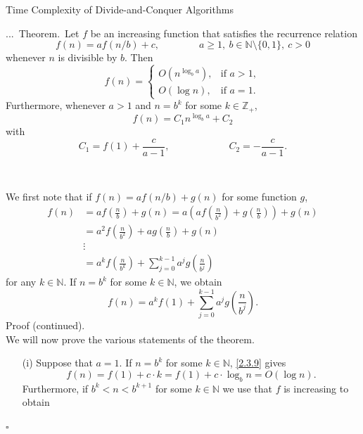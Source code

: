 \documentclass[smaller,hyperref={CJKbookmarks=true}]{beamer}
\newcommand{\N}{\mathbb{N}} \newcommand{\Z}{\mathbb{Z}} \newcommand{\Q}{\mathbb{Q}}
\newenvironment{PROOF}{{\noindent\!\sf\alert{Proof.}}\\}{\hfill$\square$\\}
\newcounter{zhuo}[subsection]
\renewcommand{\thezhuo}{\thesection.\thesubsection.\arabic{zhuo}}
\newenvironment{THEOREM}{\stepcounter{zhuo}\alert{\thezhuo.~Theorem.\,}}{}
\begin{document}
\begin{frame}{Time Complexity of Divide-and-Conquer Algorithms}
\begin{spacing}{1}
\begin{THEOREM}
Let $f$ be an increasing function that satisfies the recurrence relation
\[f(n)=af(n/b)+c,\qquad\qquad
a\geq1,~b\in\N\setminus\{0,1\},~c>0\]
whenever $n$ is divisible by $b$. Then
\[f(n)=\begin{cases}
         O(n^{\log_ba}), & \mbox{if } a>1,\\
         O(\log n), & \mbox{if } a=1.
       \end{cases}\]
Furthermore, whenever $a>1$ and $n=b^k$ for some $k\in\Z_+$,
\begin{equation}\label{2.3.8}
  f(n)=C_1n^{\log_ba}+C_2
\end{equation}
with
\[C_1=f(1)+\frac{c}{a-1},\qquad\qquad\qquad
C_2=-\frac{c}{a-1}.\]
\end{THEOREM}
\end{spacing}
\begin{PROOF}
\begin{spacing}{0.9}
We first note that if $f(n)=af(n/b)+g(n)$ for some function $g$,
\begin{equation*}
  \begin{split}
     f(n) &=af\left(\frac{n}{b}\right)+g(n)=a\left(af\left(\frac{n}{b^2}\right)+g\left(\frac{n}{b}\right)\right)+g(n) \\
       &=a^2f\left(\frac{n}{b^2}\right)+ag\left(\frac{n}{b}\right)+g(n) \\
       &\vdots \\
       &=a^kf\left(\frac{n}{b^k}\right)+\sum_{j=0}^{k-1}a^jg\left(\frac{n}{b^j}\right)
  \end{split}
\end{equation*}
for any $k\in\N$. If $n=b^k$ for some $k\in\N$, we obtain
\begin{equation}\label{2.3.9}
f(n)=a^kf(1)+\sum_{j=0}^{k-1}a^jg\left(\frac{n}{b^j}\right).
\end{equation}
\newpage
\alert{Proof (continued).}\\
We will now prove the various statements of the theorem.
\begin{itemize}
  \item[(i)] Suppose that $a=1$. If $n=b^k$ for some $k\in\N$, \eqref{2.3.9} gives
      \[f(n)=f(1)+c\cdot k=f(1)+c\cdot\log_bn=O(\log n).\]
      Furthermore, if $b^k<n<b^{k+1}$ for some $k\in\N$ we use that $f$ is increasing to obtain

\end{itemize}
\end{spacing}
\end{PROOF}
\end{frame}
\end{document}

